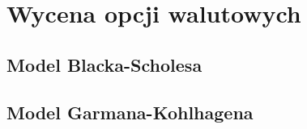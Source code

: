 \documentclass{pracamgr}
\begin{document}













\chapter{Wycena opcji walutowych}\label{r:sp}

\section{Model Blacka-Scholesa}

\section{Model Garmana-Kohlhagena}
\end{document}
